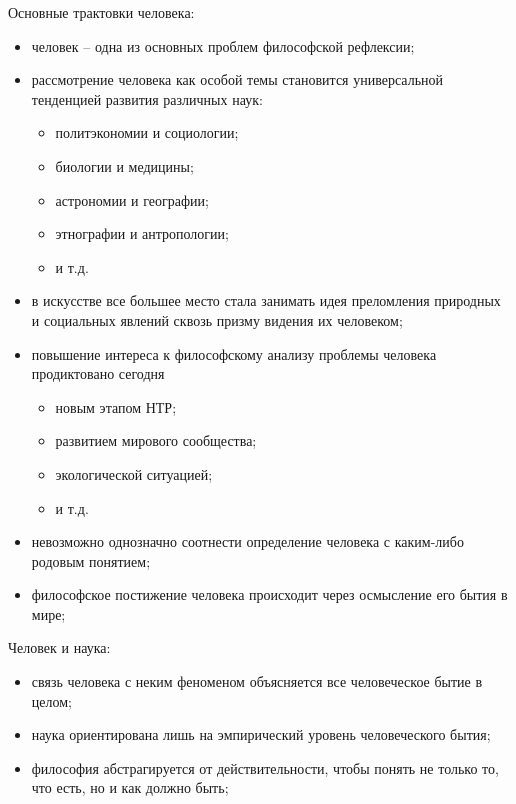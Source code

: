 
Основные трактовки человека:
\begin{itemize}
    \itemsep-1ex
    \vspace*{-1ex}
    \item человек -- одна из основных проблем философской рефлексии;
    \item рассмотрение человека как особой темы становится универсальной тенденцией развития различных наук:
    \begin{itemize}
        \itemsep-.5ex
        \vspace*{-1ex}
        \item политэкономии и социологии;
        \item биологии и медицины;
        \item астрономии и географии;
        \item этнографии и антропологии;
        \item и т.д.
    \end{itemize}
    \item в искусстве все большее место стала занимать идея преломления природных и социальных явлений 
        сквозь призму видения их человеком;
    \item повышение интереса к философскому анализу проблемы человека продиктовано сегодня
    \begin{itemize}
        \itemsep-.5ex
        \vspace*{-1ex}
        \item новым этапом НТР;
        \item развитием мирового сообщества;
        \item экологической ситуацией;
        \item и т.д.
    \end{itemize}
    \item невозможно однозначно соотнести определение человека с каким-либо родовым понятием;
    \item философское постижение человека происходит через осмысление его бытия в мире;
\end{itemize}

Человек и наука:
\begin{itemize}
    \itemsep-1ex
    \vspace*{-1ex}
    \item связь человека с неким феноменом объясняется все человеческое бытие в целом;
    \item наука ориентирована лишь на эмпирический уровень человеческого бытия;
    \item философия абстрагируется от действительности, чтобы понять не только то, что есть, но и как должно 
        быть;
\end{itemize}

